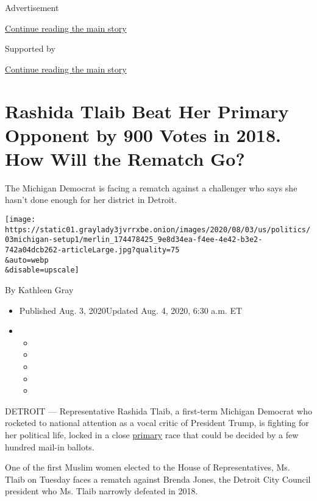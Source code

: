 Advertisement

\protect\hyperlink{after-top}{Continue reading the main story}

Supported by

\protect\hyperlink{after-sponsor}{Continue reading the main story}

\hypertarget{rashida-tlaib-beat-her-primary-opponent-by-900-votes-in-2018-how-will-the-rematch-go}{%
\section{Rashida Tlaib Beat Her Primary Opponent by 900 Votes in 2018.
How Will the Rematch
Go?}\label{rashida-tlaib-beat-her-primary-opponent-by-900-votes-in-2018-how-will-the-rematch-go}}

The Michigan Democrat is facing a rematch against a challenger who says
she hasn't done enough for her district in Detroit.

\texttt{[image: https://static01.graylady3jvrrxbe.onion/images/2020/08/03/us/politics/03michigan-setup1/merlin\_174478425\_9e8d34ea-f4ee-4e42-b3e2-742a04dcb262-articleLarge.jpg?quality=75\\\&auto=webp\\\&disable=upscale]}

By Kathleen Gray

\begin{itemize}
\item
  Published Aug. 3, 2020Updated Aug. 4, 2020, 6:30 a.m. ET
\item
  \begin{itemize}
  \item
  \item
  \item
  \item
  \item
  \end{itemize}
\end{itemize}

DETROIT --- Representative Rashida Tlaib, a first-term Michigan Democrat
who rocketed to national attention as a vocal critic of President Trump,
is fighting for her political life, locked in a close
\href{https://www.nytimes3xbfgragh.onion/2020/08/04/us/elections/primary-election-michigan-arizona-kansas.html}{primary}
race that could be decided by a few hundred mail-in ballots.

One of the first Muslim women elected to the House of Representatives,
Ms. Tlaib on Tuesday faces a rematch against Brenda Jones, the Detroit
City Council president who Ms. Tlaib narrowly defeated in 2018.

